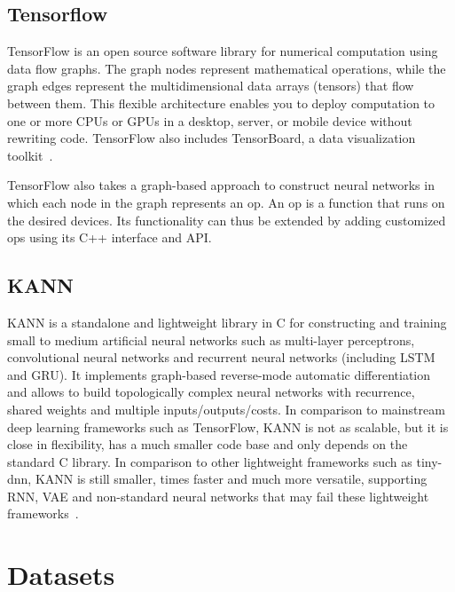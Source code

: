 \subsection{Tensorflow}
TensorFlow is an open source software library for numerical computation using 
data flow graphs. The graph nodes represent mathematical operations, while the 
graph edges represent the multidimensional data arrays (tensors) that flow 
between them.  This flexible architecture enables you to deploy computation to 
one or more CPUs or GPUs in a desktop, server, or mobile device without 
rewriting code. TensorFlow also includes TensorBoard, a data visualization 
toolkit~\cite{tensorflow}.

TensorFlow also takes a graph-based approach to construct neural networks in 
which each node in the graph represents an op. An op is a function that runs on 
the desired devices. Its functionality can thus be extended by adding customized 
ops using its C++ interface and API.

\subsection{KANN}
KANN is a standalone and lightweight library in C for constructing and training 
small to medium artificial neural networks such as multi-layer perceptrons, 
convolutional neural networks and recurrent neural networks (including LSTM and 
GRU).  It implements graph-based reverse-mode automatic differentiation and 
allows to build topologically complex neural networks with recurrence, shared 
weights and multiple inputs/outputs/costs. In comparison to mainstream deep 
learning frameworks such as TensorFlow, KANN is not as scalable, but it is close 
in flexibility, has a much smaller code base and only depends on the standard C 
library. In comparison to other lightweight frameworks such as tiny-dnn, KANN is 
still smaller, times faster and much more versatile, supporting RNN, VAE and 
non-standard neural networks that may fail these lightweight 
frameworks~\cite{kann}.

\section{Datasets}
